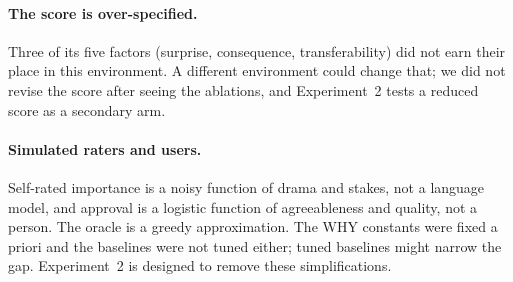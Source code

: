 \paragraph{The score is over-specified.} Three of its five factors (surprise, consequence, transferability) did not earn their place in this environment. A different environment could change that; we did not revise the score after seeing the ablations, and Experiment~2 tests a reduced score as a secondary arm.

\paragraph{Simulated raters and users.} Self-rated importance is a noisy function of drama and stakes, not a language model, and approval is a logistic function of agreeableness and quality, not a person. The oracle is a greedy approximation. The WHY constants were fixed a priori and the baselines were not tuned either; tuned baselines might narrow the gap. Experiment~2 is designed to remove these simplifications.
